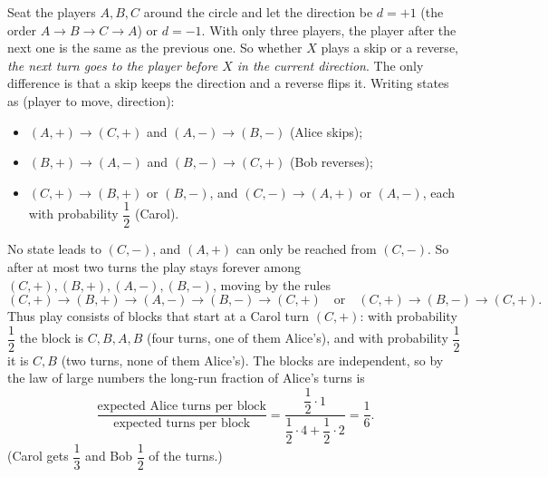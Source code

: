 Seat the players $A,B,C$ around the circle and let the direction be $d=+1$ (the order $A\to B\to C\to A$) or $d=-1$. With only three players, the player after the next one is the same as the previous one. So whether $X$ plays a skip or a reverse, \emph{the next turn goes to the player before $X$ in the current direction}. The only difference is that a skip keeps the direction and a reverse flips it. Writing states as (player to move, direction):
\begin{itemize}
\item $(A,+)\to(C,+)$ and $(A,-)\to(B,-)$ (Alice skips);
\item $(B,+)\to(A,-)$ and $(B,-)\to(C,+)$ (Bob reverses);
\item $(C,+)\to(B,+)$ or $(B,-)$, and $(C,-)\to(A,+)$ or $(A,-)$, each with probability $\dfrac{1}{2}$ (Carol).
\end{itemize}
No state leads to $(C,-)$, and $(A,+)$ can only be reached from $(C,-)$. So after at most two turns the play stays forever among $(C,+),(B,+),(A,-),(B,-)$, moving by the rules
\[(C,+)\to(B,+)\to(A,-)\to(B,-)\to(C,+)\quad\text{or}\quad(C,+)\to(B,-)\to(C,+).\]
Thus play consists of blocks that start at a Carol turn $(C,+)$: with probability $\dfrac{1}{2}$ the block is $C,B,A,B$ (four turns, one of them Alice's), and with probability $\dfrac{1}{2}$ it is $C,B$ (two turns, none of them Alice's). The blocks are independent, so by the law of large numbers the long-run fraction of Alice's turns is
\[\dfrac{\text{expected Alice turns per block}}{\text{expected turns per block}}=\dfrac{\dfrac{1}{2}\cdot1}{\dfrac{1}{2}\cdot4+\dfrac{1}{2}\cdot2}=\boxed{\dfrac{1}{6}}.\]
(Carol gets $\dfrac{1}{3}$ and Bob $\dfrac{1}{2}$ of the turns.)
